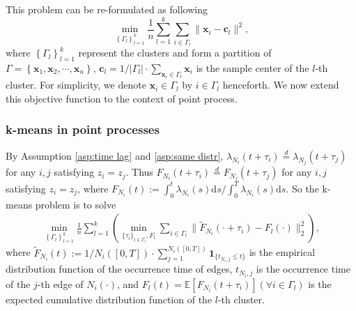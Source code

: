 			
			This problem can be re-formulated as following 
			\begin{equation}\label{eq:kmeans}
			\min_{\left\{ \Gamma_l \right\}_{l=1}^k}\frac{1}{n}\sum_{l=1}^k\sum_{i\in {\Gamma}_l} \|\mathbf{x}_i- \mathbf{c}_l\|^2,
			\end{equation}
			where $\left\{ \Gamma_l \right\}_{l=1}^k$ represent the clusters and form a partition of $\Gamma = \left\{ \mathbf{x}_1,\mathbf{x}_2,\cdots,\mathbf{x}_n \right\}$,
			$\mathbf{c}_l = {1}/{|\Gamma_l|}\cdot\sum_{\mathbf{x}_i\in \Gamma_l}\mathbf{x}_i$ is the sample center of the $l$-th cluster. 
			For simplicity, we denote $\mathbf{x}_i\in \Gamma_l$ by $i\in\Gamma_l$ henceforth.
			We now extend this objective function to the context of point process.
		
		\subsubsection*{k-means in point processes}
			By Assumption \ref{asp:time lag} and \ref{asp:same distr}, 
			$\lambda_{N_i}(t+\tau_i)\overset{d}{=}\lambda_{N_j}(t+\tau_j)$ for any $i,j$ satisfying $z_i=z_j$. Thus $F_{N_i}(t+\tau_i)\overset{d}{=}F_{N_j}(t+\tau_j)$ for any $i,j$ satisfying $z_i=z_j$, 
			where 
			$F_{N_i}(t):=\int_0^t\lambda_{N_i}(s)\text{d}s\big/\int_0^T\lambda_{N_i}(s)\text{d}s$.
			So the k-means problem is to solve
			\begin{align}\label{eq:kmeans_F}
			\min_{\left\{ \Gamma_l \right\}_{l=1}^k} \frac{1}{n} \sum_{l=1}^k \left(\min_{\{\tau_i\}_{i\in\Gamma_l},F_l} \sum_{i\in\Gamma_l} \| \tilde{F}_{N_i}(\cdot+\tau_i)- F_l(\cdot)\|_2^2 \right),
			\end{align}
			where 
			$\tilde{F}_{N_i}(t):=1/{N_i([0,T])}\cdot\sum_{j=1}^{N_i([0,T])}\mathbf{1}_{\{t_{N_i,j}\leq t\}}$ is the empirical distribution function of the occurrence time of edges,
			$t_{N_i,j}$ is the occurrence time of the $j$-th edge of $N_i(\cdot)$,
			and $F_l(t)=\mathbb{E}[F_{N_i}(t+\tau_i)] (\forall i\in\Gamma_l)$ is the expected cumulative distribution function of the $l$-th cluster.


